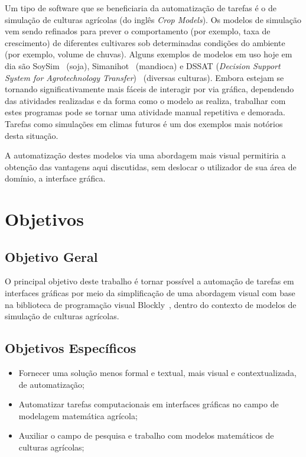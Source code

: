\documentclass[tg]{mdtufsm}
\begin{document}
        Um tipo de software que se beneficiaria da automatização de tarefas é o de simulação de culturas agrícolas (do inglês \emph{Crop Models}). Os modelos de simulação vem sendo refinados para prever o comportamento (por exemplo, taxa de crescimento) de diferentes cultivares sob determinadas condições do ambiente (por exemplo, volume de chuvas). Alguns exemplos de modelos em uso hoje em dia são SoySim~\cite{SoySim} (soja), Simanihot~\cite{Simanihot} (mandioca) e DSSAT (\emph{Decision Support System for Agrotechnology Transfer})~\cite{dssat} (diversas culturas). Embora estejam se tornando significativamente mais fáceis de interagir por via gráfica, dependendo das atividades realizadas e da forma como o modelo as realiza, trabalhar com estes programas pode se tornar uma atividade manual repetitiva e demorada. Tarefas como simulações em climas futuros é um dos exemplos mais notórios desta situação.

        A automatização destes modelos via uma abordagem mais visual permitiria a obtenção das vantagens aqui discutidas, sem deslocar o utilizador de sua área de domínio, a interface gráfica.

    	\section{Objetivos}

        	\subsection{Objetivo Geral}

            	O principal objetivo deste trabalho é tornar possível a automação de tarefas em interfaces gráficas por meio da simplificação de uma abordagem visual com base na biblioteca de programação visual Blockly~\cite{blocklyResource}, dentro do contexto de modelos de simulação de culturas agrícolas.

        	\subsection{Objetivos Específicos}

            	\begin{itemize}
            		\item Fornecer uma solução menos formal e textual, mais visual e contextualizada, de automatização;
            		\item Automatizar tarefas computacionais em interfaces gráficas no campo de modelagem matemática agrícola;
            		\item Auxiliar o campo de pesquisa e trabalho com modelos matemáticos de culturas agrícolas;
            	\end{itemize}
\end{document}

